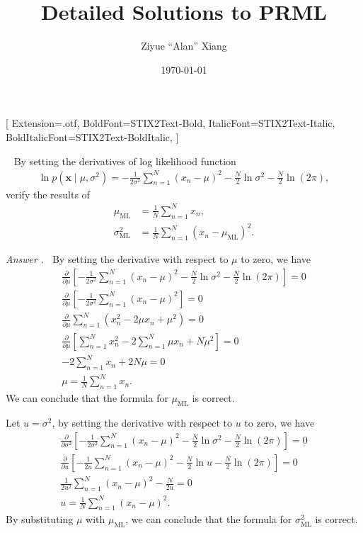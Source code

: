 \documentclass[10pt]{article}
\title{Detailed Solutions to PRML}
\author{Ziyue ``Alan'' Xiang}
\date{\today}
\newcommand{\prmlqstyle}[1]{{\color{red}\textbf{#1}}}
\newenvironment{question}[1]{\par\medskip\noindent{\prmlqstyle{#1}}~}{\medskip}
\newenvironment{answer}[1]{\par\medskip\noindent\textit{Answer #1.}~}{\medskip}
\newcommand{\bm}[1]{\symbf{#1}}
\begin{document}
\setmainfont {STIX2Text-Regular}[
Extension=.otf,
BoldFont=STIX2Text-Bold,
ItalicFont=STIX2Text-Italic,
BoldItalicFont=STIX2Text-BoldItalic,
]


\onehalfspacing

\begin{question}{1.11}
	By setting the derivatives of log likelihood function
	\begin{align*}
		\ln p(\bm{x} \mid \mu, \sigma^2) = -\frac{1}{2\sigma^2} \sum_{n=1}^{N} (x_n-\mu)^2 -\frac{N}{2}\ln\sigma^2 - \frac{N}{2}\ln(2\pi),
	\end{align*}
	verify the results of
	\begin{align*}
		\mu_{\mathrm{ML}} &= \frac{1}{N} \sum_{n=1}^{N}x_n,\\
		\sigma^2_{\mathrm{ML}} &= \frac{1}{N} \sum_{n=1}^{N} (x_n - \mu_{\mathrm{ML}})^2.
	\end{align*}
\end{question}

\begin{answer}{}
	By setting the derivative with respect to $\mu$ to zero, we have
	\begin{gather}
		\frac{\partial}{\partial \mu} \left[-\frac{1}{2\sigma^2} \sum_{n=1}^{N} (x_n-\mu)^2 -\frac{N}{2}\ln\sigma^2 - \frac{N}{2}\ln(2\pi)\right] = 0\\
		\frac{\partial}{\partial \mu} \left[-\frac{1}{2\sigma^2} \sum_{n=1}^{N} (x_n-\mu)^2 \right] = 0\\
		\frac{\partial}{\partial \mu} \sum_{n=1}^{N} (x_n^2-2\mu x_n + \mu^2) = 0\\
		\frac{\partial}{\partial \mu} \left[ \sum_{n=1}^{N}x_n^2 - 2\sum_{n=1}^{N}\mu x_n + N\mu^2  \right] = 0\\
		-2\sum_{n=1}^{N}x_n + 2N\mu = 0\\
		\mu = \frac{1}{N} \sum_{n=1}^{N} x_n.
	\end{gather}
	We can conclude that the formula for $\mu_{\mathrm{ML}}$ is correct.
	
	Let $u = \sigma^2$, by setting the derivative with respect to $u$ to zero, we have
	\begin{gather*}
		\frac{\partial}{\partial \sigma^2} \left[-\frac{1}{2\sigma^2} \sum_{n=1}^{N} (x_n-\mu)^2 -\frac{N}{2}\ln\sigma^2 - \frac{N}{2}\ln(2\pi)\right] = 0\\
		\frac{\partial}{\partial u} \left[-\frac{1}{2u} \sum_{n=1}^{N} (x_n-\mu)^2 -\frac{N}{2}\ln u - \frac{N}{2}\ln(2\pi)\right] = 0\\
		\frac{1}{2u^2}  \sum_{n=1}^{N} (x_n-\mu)^2 - \frac{N}{2u} = 0\\
		u = \frac{1}{N} \sum_{n=1}^{N} (x_n-\mu)^2.
	\end{gather*}
	By substituting $\mu$ with $\mu_{\mathrm{ML}}$, we can conclude that the formula for $\sigma^2_{\mathrm{ML}}$ is correct.
\end{answer}
\end{document}
